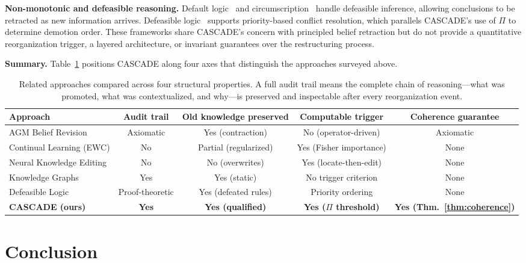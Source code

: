 \documentclass[11pt,a4paper]{article}
\theoremstyle{definition}
\newcommand{\tp}{\Pi}
\begin{document}
\textbf{Non-monotonic and defeasible reasoning.} Default logic~\citep{reiter1980logic}
and circumscription~\citep{mccarthy1980circumscription} handle defeasible inference,
allowing conclusions to be retracted as new information arrives. Defeasible
logic~\citep{nute1994defeasible} supports priority-based conflict resolution, which
parallels CASCADE's use of $\tp$ to determine demotion order. These frameworks share
CASCADE's concern with principled belief retraction but do not provide a quantitative
reorganization trigger, a layered architecture, or invariant guarantees over the
restructuring process.

\textbf{Summary.} Table~\ref{tab:related} positions CASCADE along four axes that
distinguish the approaches surveyed above.

\begin{table}[H]
\centering
\caption{Related approaches compared across four structural properties. A full audit
trail means the complete chain of reasoning---what was promoted, what was contextualized,
and why---is preserved and inspectable after every reorganization event.}
\label{tab:related}
\begin{tabular}{@{}lcccc@{}}
\toprule
\textbf{Approach} & \textbf{Audit trail} & \textbf{Old knowledge preserved} & \textbf{Computable trigger} & \textbf{Coherence guarantee} \\
\midrule
AGM Belief Revision        & Axiomatic  & Yes (contraction)     & No (operator-driven)   & Axiomatic \\
Continual Learning (EWC)   & No         & Partial (regularized) & Yes (Fisher importance) & None \\
Neural Knowledge Editing   & No         & No (overwrites)       & Yes (locate-then-edit) & None \\
Knowledge Graphs           & Yes        & Yes (static)          & No trigger criterion   & None \\
Defeasible Logic           & Proof-theoretic & Yes (defeated rules) & Priority ordering   & None \\
\midrule
\textbf{CASCADE (ours)}    & \textbf{Yes} & \textbf{Yes (qualified)} & \textbf{Yes ($\tp$ threshold)} & \textbf{Yes (Thm.~\ref{thm:coherence})} \\
\bottomrule
\end{tabular}
\end{table}

\section{Conclusion}\label{sec:conclusion}
\end{document}
